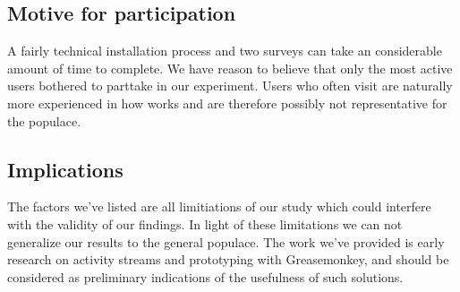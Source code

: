 \subsection{Motive for participation}

A fairly technical installation process and two surveys can take an
considerable amount of time to complete. We have reason to believe that only
the most active \urort{} users bothered to parttake in our experiment. Users
who often visit \urort{} are naturally more experienced in how \urort{} works
and are therefore possibly not representative for the \urort{} populace.

\subsection{Implications}

The factors we've listed are all limitiations of our study which could
interfere with the validity of our findings.
In light of these limitations we can not generalize
our results to the general \urort{} populace. The work we've
provided is early research on activity streams and prototyping with
Greasemonkey, and should be considered as preliminary indications of the
usefulness of such solutions.
